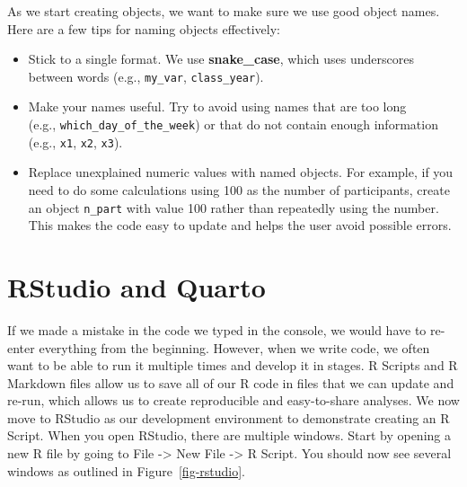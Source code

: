 \documentclass[
  letterpaper,
]{latex/krantz}
\providecommand{\tightlist}{%
  \setlength{\itemsep}{0pt}\setlength{\parskip}{0pt}}\usepackage{longtable,booktabs,array}
\begin{document}
As we start creating objects, we want to make sure we use good object
names. Here are a few tips for naming objects
effectively:

\begin{itemize}
\tightlist
\item
  Stick to a single format. We use \textbf{snake\_case}, which uses
  underscores between words (e.g., \texttt{my\_var},
  \texttt{class\_year}).\\
\item
  Make your names useful. Try to avoid using names that are too long\\
  (e.g., \texttt{which\_day\_of\_the\_week}) or that do not contain
  enough information (e.g., \texttt{x1}, \texttt{x2}, \texttt{x3}).\\
\item
  Replace unexplained numeric values with named objects. For example, if
  you need to do some calculations using 100 as the number of
  participants, create an object \texttt{n\_part} with value 100 rather
  than repeatedly using the number. This makes the code easy to update
  and helps the user avoid possible errors.
\end{itemize}

\section{RStudio and Quarto}\label{rstudio-and-quarto}

If we made a mistake in the code we typed in the console, we would have
to re-enter everything from the beginning. However, when we write code,
we often want to be able to run it multiple times and develop it in
stages. R Scripts  and R Markdown 
files allow us to save all of our R code in files that we can update and
re-run, which allows us to create reproducible and easy-to-share
analyses. We now move to RStudio 
as our development environment to demonstrate creating an R Script. When
you open RStudio, there are multiple windows. Start by opening a new R
file by going to File -\textgreater{} New File -\textgreater{} R Script.
You should now see several windows as outlined in
Figure~\ref{fig-rstudio}.
\end{document}
